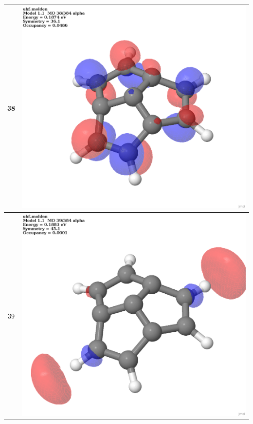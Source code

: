 \documentclass{article}
\begin{document}
\begin{tabular}{|c|c|}
38 & \includegraphics[scale=0.1]{M1T_38.png}\\ \hline
39 & \includegraphics[scale=0.1]{M1T_39.png}\\ \hline

\end{tabular}
\end{document}
